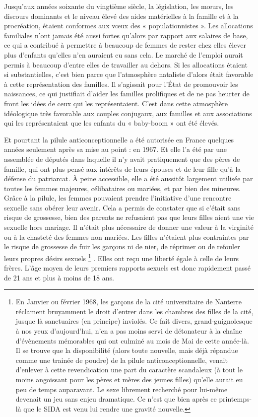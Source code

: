  Jusqu'aux années soixante du vingtième siècle, la législation, les mœurs, les discours dominants et le niveau élevé des aides matérielles à la famille et à la procréation, étaient conformes aux vœux des « populationnistes ». Les allocations familiales n'ont jamais été aussi fortes qu'alors par rapport aux salaires de base, ce qui a contribué à permettre à beaucoup de femmes de rester chez elles élever plus d'enfants qu'elles n'en auraient eu sans cela. Le marché de l'emploi aurait permis à beaucoup d'entre elles de travailler au dehors. Si les allocations étaient si substantielles, c'est bien parce que l'atmosphère nataliste d'alors était favorable à cette représentation des familles. Il s'agissait pour l'État de promouvoir les naissances, ce qui justifiait d'aider les familles prolifiques et de ne pas heurter de front les idées de ceux qui les représentaient. C'est dans cette atmosphère idéologique très favorable aux couples conjugaux, aux familles et aux associations qui les représentaient que les enfants du « baby-boom » ont été élevés. 

 Et pourtant la pilule anticonceptionnelle a été autorisée en France quelques années seulement après sa mise au point : en 1967. Et elle l'a été par une assemblée de députés dans laquelle il n'y avait pratiquement que des pères de famille, qui ont plus pensé aux intérêts de leurs épouses et de leur fille qu'à la défense du patriarcat. À peine accessible, elle a été aussitôt largement utilisée par toutes les femmes majeures, célibataires ou mariées, et par bien des mineures. Grâce à la pilule, les femmes pouvaient prendre l'initiative d'une rencontre sexuelle sans obérer leur avenir. Cela a permis de constater que si c'était sans risque de grossesse, bien des parents ne refusaient pas que leurs filles aient une vie sexuelle hors mariage. Il n'était plus nécessaire de donner une valeur à la virginité ou à la chasteté des femmes non mariées. Les filles n'étaient plus contraintes par le risque de grossesse de fuir les garçons ni de nier, de réprimer ou de refouler leurs propres désirs sexuels%
\footnote{En Janvier ou février 1968, les garçons de la cité universitaire de Nanterre réclament bruyamment le droit d'entrer dans les chambres des filles de la cité, jusque là sanctuaires (en principe) inviolés. Ce fait divers, grand-guignolesque à nos yeux d'aujourd'hui, n'en a pas moins servi de détonateur à la chaîne d'évènements mémorables qui ont culminé au mois de Mai de cette année-là. Il se trouve que la disponibilité (alors toute nouvelle, mais déjà répandue comme une trainée de poudre) de la pilule anticonceptionnelle, venait d'enlever à cette revendication une part du caractère scandaleux (à tout le moins angoissant pour les pères et mères des jeunes filles) qu'elle aurait eu peu de temps auparavant. Le sexe librement recherché pour lui-même devenait un jeu sans enjeu dramatique. Ce n'est que bien après ce printemps-là que le SIDA est venu lui rendre une gravité nouvelle.}%
. Elles ont reçu une liberté égale à celle de leurs frères. L'âge moyen de leurs premiers rapports sexuels est donc rapidement passé de 21 ans et plus à moins de 18 ans.

